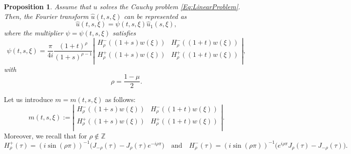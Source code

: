 \documentclass[10pt]{article}
\newtheorem{proposition}{Proposition}[section]
\newcommand{\<}{\langle}
\renewcommand{\>}{\rangle}
\numberwithin{equation}{section}
\newcommand{\Z}{{\mathbb{Z}}}
\begin{document}
\begin{proposition} \label{Prop-Hankel}
Assume that $u$ solves the Cauchy problem \eqref{Eq:LinearProblem}. Then, the Fourier transform $\hat{u}(t, s,\xi)$ can be represented as
\[ \widehat{u}(t,s,\xi)= \psi(t,s,\xi) \widehat{u}_1(s,\xi), \]
where the multiplier $\psi=\psi(t,s,\xi)$ satisfies
\begin{equation*}\label{Eq:Hankel}
\psi(t,s,\xi)=\frac{\pi}{4i}\frac{(1+t)^{\rho}}{(1+s)^{\rho-1}}
\left|
\begin{array}{cc}
H^-_{\rho}\left( (1+s)w(\xi) \right) & H^-_{\rho}\left( (1+t)w(\xi) \right) \\
H^+_{\rho}\left( (1+s)w(\xi) \right) & H^+_{\rho}\left((1+t)w(\xi) \right) \\
\end{array} \right|,
\end{equation*}
with
\[ \rho= \frac{1-\mu}{2}. \]
\end{proposition}
Let us introduce $m=m(t,s,\xi)$ as follows:
\[ m(t,s,\xi) :=
\left|
\begin{array}{cc}
H^-_{\rho}\left( (1+s)w(\xi) \right) & H^-_{\rho}\left( (1+t)w(\xi) \right) \\
H^+_{\rho}\left( (1+s)w(\xi) \right) & H^+_{\rho}\left((1+t)w(\xi) \right) \\
\end{array} \right|. \]
Moreover, we recall that for $\rho\notin \Z$
\begin{equation} \label{Eq:Hankel-property}
H_{\rho}^{+}(\tau)= (i\sin(\rho\pi))^{-1}\big( J_{-\rho}(\tau)-J_{\rho}(\tau)e^{-i\rho \pi} \big) \quad \text{and} \quad  H_{\rho}^{-}(\tau)= (i\sin(\rho\pi))^{-1}\big(e^{i\rho \pi}  J_{\rho}(\tau)-J_{-\rho}(\tau) \big).
\end{equation}
\end{document}
